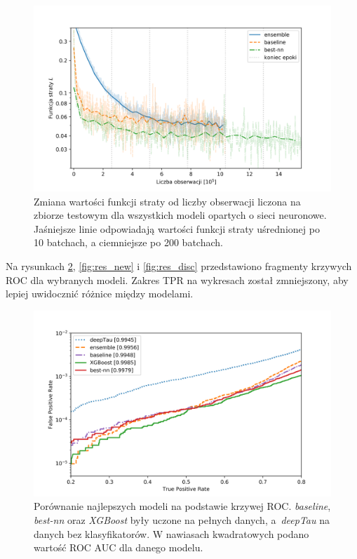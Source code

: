 \documentclass{pracalicmgr}
\begin{document}
	\begin{figure}
	\centering
	\includegraphics[width=1.\textwidth]{loss_all.png}
	\caption{Zmiana wartości funkcji straty od liczby obserwacji liczona na zbiorze testowym dla wszystkich modeli opartych o sieci neuronowe. Jaśniejsze linie odpowiadają wartości funkcji straty uśrednionej po 10 batchach, a ciemniejsze po 200 batchach.}
	\label{fig:loss_all}
	\end{figure}	
	Na rysunkach \ref{fig:res_best}, \ref{fig:res_new} i \ref{fig:res_disc} przedstawiono fragmenty krzywych ROC dla wybranych modeli. Zakres TPR na wykresach został zmniejszony, aby lepiej uwidocznić różnice między modelami.
	
	\begin{figure}
	\centering
	\includegraphics[width=1\textwidth]{best_models.png}
	\caption{Porównanie najlepszych modeli na podstawie krzywej ROC.  \textit{baseline}, \textit{best-nn} oraz \textit{XGBoost} były uczone na pełnych danych, a~\textit{deepTau} na danych bez klasyfikatorów. W nawiasach kwadratowych podano wartość ROC AUC dla danego modelu.}
	\label{fig:res_best}	
	\end{figure}
	
\end{document}
